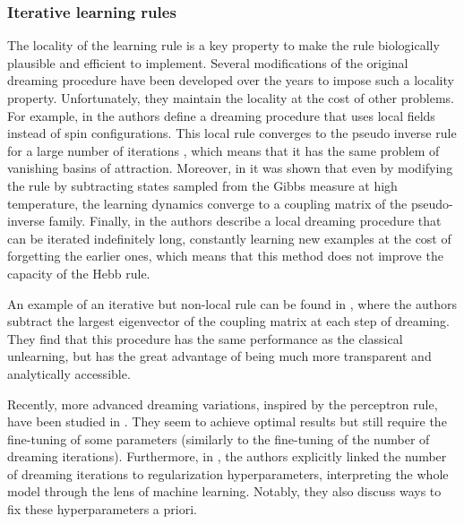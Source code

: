 \documentclass[a4paper]{cas-sc}
\begin{document}
\subsubsection{Iterative learning rules}

The locality of the learning rule is a key property to make the rule biologically plausible and efficient to implement. Several modifications of the original dreaming procedure have been developed over the years to impose such a locality property. Unfortunately, they maintain the locality at the cost of other problems.
For example, in \cite{plakhov1992modified,plakhov1994converging,plakhov1995convergent} the authors define a dreaming procedure that uses local fields instead of spin configurations. This local rule converges to the pseudo inverse rule for a large number of iterations \cite{kanter1987associative}, which means that it has the same problem of vanishing basins of attraction. 
Moreover, in \cite{nokura1996paramagnetic, nokura1996unlearning} it was shown that even by modifying the rule by subtracting states sampled from the Gibbs measure at high temperature, the learning dynamics converge to a coupling matrix of the pseudo-inverse family.
Finally, in \cite{parisi1986memory, Marinari2019} the authors describe a local dreaming procedure that can be iterated indefinitely long, constantly learning new examples at the cost of forgetting the earlier ones, which means that this method does not improve the capacity of the Hebb rule.

An example of an iterative but non-local rule can be found in  \cite{benedetti2023eigenvector}, where the authors subtract the largest eigenvector of the coupling matrix at each step of dreaming. They find that this procedure has the same performance as the classical unlearning, but has the great advantage of being much more transparent and analytically accessible.

Recently, more advanced dreaming variations, inspired by the perceptron rule, have been studied in \cite{benedetti2022supervised, benedetti2023training}. They seem to achieve optimal results but still require the fine-tuning of some parameters (similarly  to the fine-tuning of the number of dreaming iterations). Furthermore, in \cite{agliari2023regularization}, the authors explicitly linked the number of dreaming iterations to regularization hyperparameters, interpreting the whole model through the lens of machine learning. Notably, they also discuss ways to fix these hyperparameters a priori.
\end{document}
